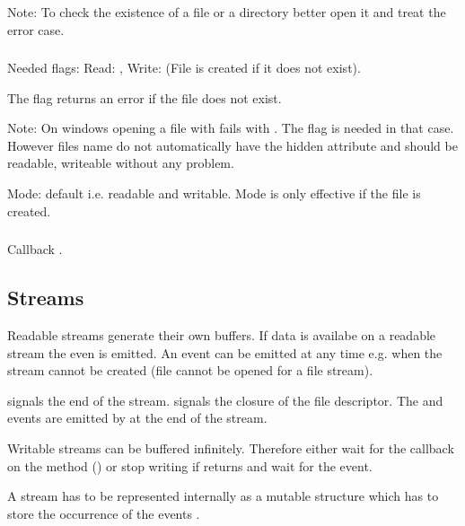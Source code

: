 Note: To check the existence of a file or a directory better open it and treat
the error case.

\subsubsection{}

Needed flags: Read: , Write:  (File is created if it does
not exist).

The flag  returns an error if the file does not exist.

Note: On windows opening a file with  fails with . The
 flag is needed in that case. However files name  do
not automatically have the hidden attribute and should be readable, writeable
without any problem.

Mode: default  i.e. readable and writable. Mode is only effective
if the file is created.

\subsubsection{}

Callback .






\subsection{Streams}

Readable streams generate their own buffers. If data is availabe on a readable
stream the even  is emitted. An  event can be
emitted at any time e.g. when the stream cannot be created (file cannot be
opened for a file stream).

 signals the end of the stream.  signals the closure of
the file descriptor. The  and  events are emitted by
 at the end of the stream.

Writable streams can be buffered infinitely. Therefore either wait for the
callback on the  method () or stop writing
if  returns  and wait for the  event.

A stream has to be represented internally as a mutable structure which has to
store the occurrence of the events .

